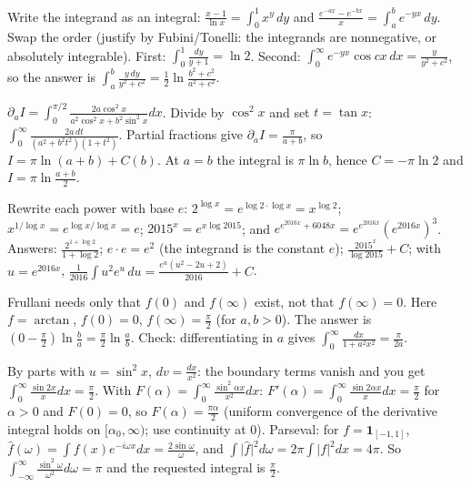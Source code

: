 \documentclass[11pt,a4paper]{article}
\begin{document}
Write the integrand as an integral: \(\frac{x-1}{\ln x}=\int_0^1x^y\,dy\) and \(\frac{e^{-ax}-e^{-bx}}x=\int_a^be^{-yx}\,dy\). Swap the order (justify by Fubini/Tonelli: the integrands are nonnegative, or absolutely integrable).
First: \(\int_0^1\frac{dy}{y+1}=\ln2\). Second: \(\int_0^\infty e^{-yx}\cos cx\,dx=\frac y{y^2+c^2}\), so the answer is \(\int_a^b\frac{y\,dy}{y^2+c^2}=\frac12\ln\frac{b^2+c^2}{a^2+c^2}\).

\(\partial_a I=\int_0^{\pi/2}\frac{2a\cos^2x}{a^2\cos^2x+b^2\sin^2x}dx\). Divide by \(\cos^2x\) and set \(t=\tan x\): \(\int_0^\infty\frac{2a\,dt}{(a^2+b^2t^2)(1+t^2)}\).
Partial fractions give \(\partial_aI=\frac{\pi}{a+b}\), so \(I=\pi\ln(a+b)+C(b)\). At \(a=b\) the integral is \(\pi\ln b\), hence \(C=-\pi\ln2\) and \(I=\pi\ln\frac{a+b}2\).

Rewrite each power with base \(e\): \(2^{\log x}=e^{\log2\cdot\log x}=x^{\log2}\); \(x^{1/\log x}=e^{\log x/\log x}=e\); \(2015^x=e^{x\log2015}\); and \(e^{e^{2016x}+6048x}=e^{e^{2016x}}\left(e^{2016x}\right)^3\).
Answers: \(\frac{2^{1+\log2}}{1+\log2}\); \(e\cdot e=e^2\) (the integrand is the constant \(e\)); \(\frac{2015^x}{\log2015}+C\); with \(u=e^{2016x}\), \(\frac1{2016}\int u^2e^u\,du=\frac{e^{u}(u^2-2u+2)}{2016}+C\).

Frullani needs only that \(f(0)\) and \(f(\infty)\) exist, not that \(f(\infty)=0\). Here \(f=\arctan\), \(f(0)=0\), \(f(\infty)=\frac\pi2\) (for \(a,b\gt0\)).
The answer is \(\left(0-\frac\pi2\right)\ln\frac ba=\frac\pi2\ln\frac ab\). Check: differentiating in \(a\) gives \(\int_0^\infty\frac{dx}{1+a^2x^2}=\frac{\pi}{2a}\).

By parts with \(u=\sin^2x\), \(dv=\frac{dx}{x^2}\): the boundary terms vanish and you get \(\int_0^\infty\frac{\sin2x}xdx=\frac\pi2\).
With \(F(\alpha)=\int_0^\infty\frac{\sin^2\alpha x}{x^2}dx\): \(F'(\alpha)=\int_0^\infty\frac{\sin2\alpha x}xdx=\frac\pi2\) for \(\alpha\gt0\) and \(F(0)=0\), so \(F(\alpha)=\frac{\pi\alpha}2\) (uniform convergence of the derivative integral holds on \([\alpha_0,\infty)\); use continuity at \(0\)).
Parseval: for \(f=\mathbf 1_{[-1,1]}\), \(\hat f(\omega)=\int f(x)e^{-i\omega x}dx=\frac{2\sin\omega}\omega\), and \(\int\lvert\hat f\rvert^2d\omega=2\pi\int\lvert f\rvert^2dx=4\pi\). So \(\int_{-\infty}^\infty\frac{\sin^2\omega}{\omega^2}d\omega=\pi\) and the requested integral is \(\frac\pi2\).
\end{document}
